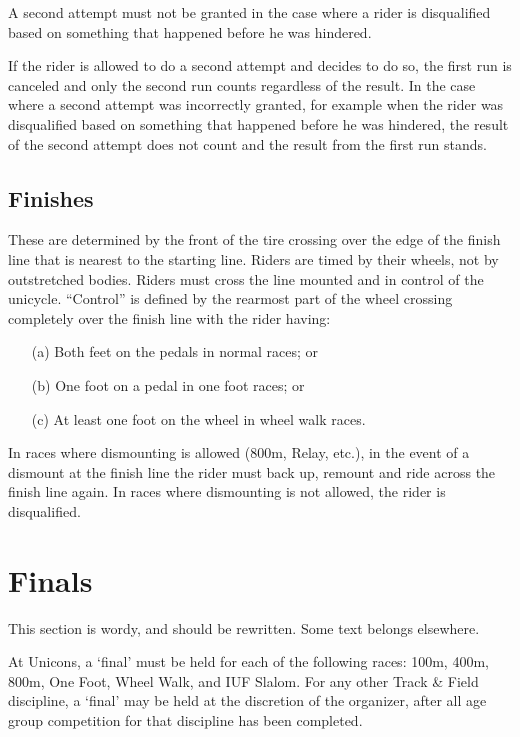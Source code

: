 A second attempt must not be granted in the case where a rider is disqualified based on something that happened before he was hindered.

If the rider is allowed to do a second attempt and decides to do so, the first run is canceled and only the second run counts regardless of the result.
In the case where a second attempt was incorrectly granted, for example when the rider was disqualified based on something that happened before he was hindered, the result of the second attempt does not count and the result from the first run stands.

\subsection{Finishes \label{sec:track-field_finishes}}

These are determined by the front of the tire crossing over the edge of the finish line that is nearest to the starting line.
Riders are timed by their wheels, not by outstretched bodies.
Riders must cross the line mounted and in control of the unicycle.
``Control'' is defined by the rearmost part of the wheel crossing completely over the finish line with the rider having: 
\begin{enumerate}
\item[(a)] Both feet on the pedals in normal races; or 
\item[(b)] One foot on a pedal in one foot races; or 
\item[(c)] At least one foot on the wheel in wheel walk races.
\end{enumerate}
In races where dismounting is allowed (800m, Relay, etc.), in the event of a dismount at the finish line the rider must back up, remount and ride across the finish line again.
In races where dismounting is not allowed, the rider is disqualified.

\section{Finals}

\begin{comment2016}
This section is wordy, and should be rewritten.
Some text belongs elsewhere.
\end{comment2016}

At Unicons, a `final' must be held for each of the following races: 100m, 400m, 800m, One Foot, Wheel Walk, and IUF Slalom.
For any other Track \& Field discipline, a `final' may be held at the discretion of the organizer, after all age group competition for that discipline has been completed.

